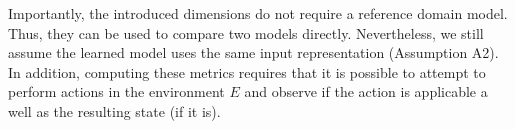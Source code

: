 \documentclass[letterpaper]{article} %
\newif\ifaddcomments
\newcommand{\roni}[1]{\ifaddcomments{\textcolor{red}{[Roni: #1]}}\fi}
\begin{document}
Importantly, the introduced dimensions do not require a reference domain model. 
Thus, they can be used to compare two models directly. %
Nevertheless, we still assume the learned model uses the same input representation (Assumption A2).  
In addition, computing these metrics requires that it is possible to attempt to perform actions in the environment $E$ and observe if the action is applicable a well as the resulting state (if it is). %








\end{document}
